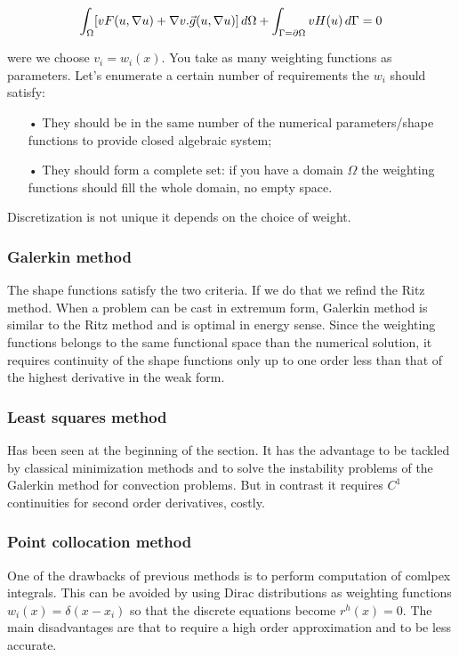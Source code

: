 \begin{equation}
\int _\Omega [v F(u, \nabla u) + \nabla v . \vec{g} (u,\nabla u) ] \, d\Omega + \int _{\Gamma = \partial \Omega} vH(u) \, d\Gamma = 0
\end{equation}

were we choose $v_i = w_i(x)$. You take as many weighting functions as parameters. Let's enumerate a certain number of requirements the $w_i$ should satisfy: 

\begin{itemize}
\item[•] They should be in the same number of the numerical parameters/shape functions to provide closed algebraic system;
\item[•] They should form a complete set: if you have a domain $\Omega$ the weighting functions should fill the whole domain, no empty space. 
\end{itemize}

Discretization is not unique it depends on the choice of weight. 

\subsubsection{Galerkin method}
The shape functions satisfy the two criteria. If we do that we refind the Ritz method. When a problem can be cast in extremum form, Galerkin method is similar to the Ritz method and is optimal in energy sense. Since the weighting functions belongs to the same functional space than the numerical solution, it requires continuity of the shape functions only up to one order less than that of the highest derivative in the weak form.

\subsubsection{Least squares method}
Has been seen at the beginning of the section. It has the advantage to be tackled by classical minimization methods and to solve the instability problems of the Galerkin method for convection problems. But in contrast it requires $C^1$ continuities for second order derivatives, costly. 

\subsubsection{Point collocation method}
One of the drawbacks of previous methods is to perform computation of comlpex integrals. This can be avoided by using Dirac distributions as weighting functions $w_i (x) = \delta (x-x_i)$ so that the discrete equations become $r^h (x) = 0$. The main disadvantages are that to require a high order approximation and to be less accurate.   

